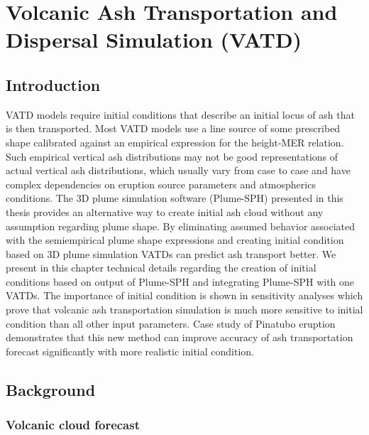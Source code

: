 \chapter{Volcanic Ash Transportation and Dispersal Simulation (VATD)} \label{chapter:ash-transportation}

\section{Introduction}

VATD models require initial conditions that describe an initial locus of ash that is then transported.
Most VATD models use a line source of some prescribed shape calibrated against an empirical expression for the height-MER relation. %
Such empirical vertical ash distributions may not be good representations of actual vertical ash distributions, which usually vary from case to case and have complex dependencies on eruption source parameters and atmospherics conditions.
The 3D plume simulation software (Plume-SPH) presented in this thesis provides an alternative way to create initial ash cloud without any assumption regarding plume shape. 
By eliminating assumed behavior associated with the semiempirical plume shape expressions and creating initial condition based on 3D plume simulation VATDs can  predict ash transport better.
We present in this chapter technical details regarding the creation of initial conditions based on output of Plume-SPH and integrating Plume-SPH with one VATDs.
The importance of initial condition is shown in sensitivity analyses which prove that volcanic ash transportation simulation is much more sensitive to initial condition than all other input parameters.
Case study of Pinatubo eruption demonstrates that this new method can improve accuracy of ash transportation forecast significantly with more realistic initial condition.

\section{Background}

\subsection{Volcanic cloud forecast}


